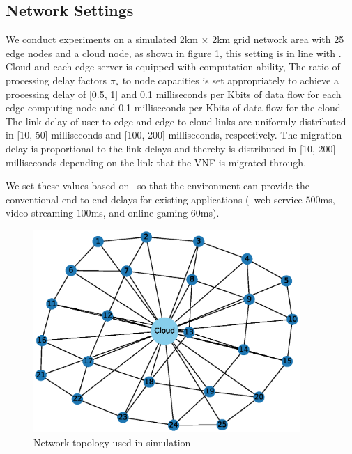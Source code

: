 \subsection{Network Settings}
We conduct experiments on a simulated 2km $\times$ 2km grid network area with 25 edge nodes and a cloud node, as shown in figure \ref{fig:simtopology}, this setting is in line with \cite{MABserviceplacement}. 
%
Cloud and each edge server is equipped with computation ability, 
The ratio of processing delay factors $\pi_s$ to node capacities is set appropriately to achieve a processing delay of [0.5, 1]  and  0.1 milliseconds per Kbits of data flow for each edge computing node and 0.1 milliseconds per Kbits of data flow for the cloud. 
%
The link delay of user-to-edge and edge-to-cloud links are uniformly distributed in [10, 50] milliseconds and [100, 200] milliseconds, respectively.  The migration delay is proportional to the link delays and thereby is distributed in [10, 200] milliseconds depending on the link that the VNF is migrated through.

We set these values based on~\cite{SFCsettingsapp} so that the environment can provide the conventional end-to-end delays for existing applications (\eg\ web service $500$ms, video streaming $100$ms, and online gaming $60$ms). 

\begin{figure}
	\centering
	\includegraphics[width=0.9\textwidth]{figs/topology.eps}
		\vspace{\baselineskip}
	\caption{Network topology used in simulation}
	\label{fig:simtopology}
\end{figure}


